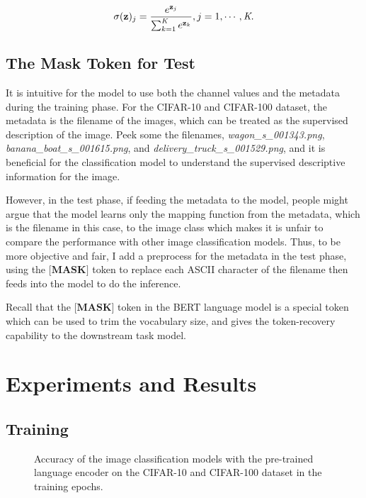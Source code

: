 \documentclass[review]{cvpr}
\begin{document}
\begin{equation}
  \sigma(\textbf{z})_j = {e^{\textbf{z}_j} \over {\sum_{k=1}^{\textit{K}} e^{\textbf{z}_k}}}, j=1,\cdots,\textit{K}.
\end{equation}

\subsection{The Mask Token for Test}

\par It is intuitive for the model to use both the channel values and the metadata during the training phase.
For the CIFAR-10 and CIFAR-100 dataset, the metadata is the filename of the images, which can be treated as the supervised description of the image.
Peek some the filenames, \eg \textit{wagon\_s\_001343.png}, \textit{banana\_boat\_s\_001615.png}, and \textit{delivery\_truck\_s\_001529.png},
and it is beneficial for the classification model to understand the supervised descriptive information for the image.

\par However, in the test phase, if feeding the metadata to the model, people might argue that the model learns only the mapping function from
the metadata, which is the filename in this case, to the image class
which makes it is unfair to compare the performance with other image classification models.
Thus, to be more objective and fair, I add a preprocess for the metadata in the test phase, using the $\textbf{[MASK]}$ token to replace each
ASCII character of the filename then feeds into the model to do the inference.

\par Recall that the $\textbf{[MASK]}$ token in the BERT language model is a special token which can be used to trim the vocabulary size,
and gives the token-recovery capability to the downstream task model.



\section{Experiments and Results}


\subsection{Training}

\begin{figure*}
\begin{center}
\end{center}
   \caption{Accuracy of the image classification models with the pre-trained language encoder on the CIFAR-10 and CIFAR-100 dataset in the training epochs.}
\label{fig:short}
\end{figure*}
\end{document}
